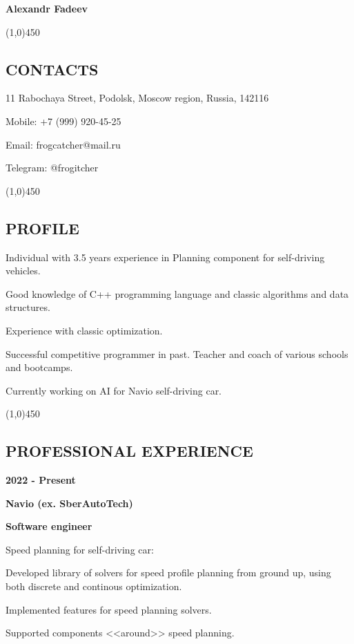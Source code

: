 \documentclass[a4paper,12pt,preview]{report}
\newcommand{\hr}{\begin{center} \line(1,0){450} \end{center}}
\begin{document}
\begin{center}
    \Huge \textbf{Alexandr Fadeev}
\end{center}

\hr

\subsection*{CONTACTS}

11 Rabochaya Street, Podolsk, Moscow region, Russia, 142116

Mobile: +7 (999) 920-45-25

Email: frogcatcher@mail.ru

Telegram: @frogitcher

\hr

\subsection*{PROFILE}

Individual with 3.5 years experience in Planning component for self-driving vehicles. 

Good knowledge of C++ programming language and classic algorithms and data structures. 

Experience with classic optimization.

Successful competitive programmer in past. Teacher and coach of various schools and bootcamps.

Currently working on AI for Navio self-driving car.

\hr

 
\subsection*{PROFESSIONAL EXPERIENCE}

\begin{multicols}{2}
    \textbf{2022 - Present} 

    \columnbreak

    \textbf{Navio (ex. SberAutoTech)}

    \textbf{Software engineer}
\end{multicols}

\begin{minipage}[c]{0.30\linewidth}
    Speed planning for self-driving car:
\end{minipage}
\hfill
\begin{minipage}[c]{0.60\linewidth}
	Developed library of solvers for speed profile planning from ground up, using both discrete and continous optimization.
	
	Implemented features for speed planning solvers.
	
	Supported components <<around>> speed planning. 
\end{minipage}
\end{document}

